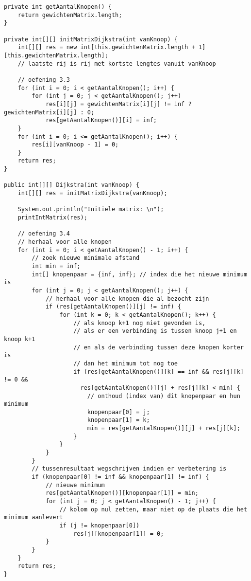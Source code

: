 \begin{Oplossing}{9.4}
\begin{lstlisting}[caption={Dijkstra}, label=Dijkstra]
private int getAantalKnopen() {
    return gewichtenMatrix.length;
}

private int[][] initMatrixDijkstra(int vanKnoop) {
    int[][] res = new int[this.gewichtenMatrix.length + 1][this.gewichtenMatrix.length];
    // laatste rij is rij met kortste lengtes vanuit vanKnoop

    // oefening 3.3
    for (int i = 0; i < getAantalKnopen(); i++) {
        for (int j = 0; j < getAantalKnopen(); j++)
            res[i][j] = gewichtenMatrix[i][j] != inf ? gewichtenMatrix[i][j] : 0;
            res[getAantalKnopen()][i] = inf;
    }
    for (int i = 0; i <= getAantalKnopen(); i++) {
        res[i][vanKnoop - 1] = 0;
    }
    return res;
}

public int[][] Dijkstra(int vanKnoop) {
    int[][] res = initMatrixDijkstra(vanKnoop);

    System.out.println("Initiele matrix: \n");
    printIntMatrix(res);

    // oefening 3.4
    // herhaal voor alle knopen
    for (int i = 0; i < getAantalKnopen() - 1; i++) {
        // zoek nieuwe minimale afstand
        int min = inf;
        int[] knopenpaar = {inf, inf}; // index die het nieuwe minimum is
        for (int j = 0; j < getAantalKnopen(); j++) {
            // herhaal voor alle knopen die al bezocht zijn
            if (res[getAantalKnopen()][j] != inf) {
                for (int k = 0; k < getAantalKnopen(); k++) {
                    // als knoop k+1 nog niet gevonden is,
                    // als er een verbinding is tussen knoop j+1 en knoop k+1
                    // en als de verbinding tussen deze knopen korter is
                    // dan het minimum tot nog toe
                    if (res[getAantalKnopen()][k] == inf && res[j][k] != 0 &&
                      res[getAantalKnopen()][j] + res[j][k] < min) {
                        // onthoud (index van) dit knopenpaar en hun minimum
                        knopenpaar[0] = j;
                        knopenpaar[1] = k;
                        min = res[getAantalKnopen()][j] + res[j][k];
                    }
                }
            }
        }
        // tussenresultaat wegschrijven indien er verbetering is
        if (knopenpaar[0] != inf && knopenpaar[1] != inf) {
            // nieuwe minimum
            res[getAantalKnopen()][knopenpaar[1]] = min;
            for (int j = 0; j < getAantalKnopen() - 1; j++) {
                // kolom op nul zetten, maar niet op de plaats die het minimum aanlevert
                if (j != knopenpaar[0])
                    res[j][knopenpaar[1]] = 0;
            }
        }
    }
    return res;
}
\end{lstlisting}
\end{Oplossing}
